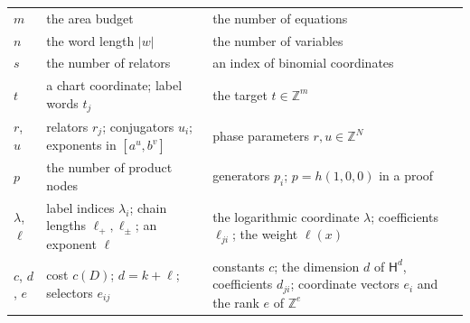 \documentclass[11pt,letterpaper]{article}
\theoremstyle{definition}
\theoremstyle{remark}
\newcommand{\Z}{\mathbb Z}
\newcommand{\HH}{\mathsf H}
\begin{document}
\begin{center}
\begin{longtable}{@{}p{}p{}p{}@{}}
$m$ & the area budget & the number of equations\\
$n$ & the word length $|w|$ & the number of variables\\
$s$ & the number of relators & an index of binomial coordinates\\
$t$ & a chart coordinate; label words $t_j$ & the target $t\in\Z^m$\\
$r$, $u$ & relators $r_j$; conjugators $u_i$; exponents in $[a^u,b^v]$ & phase parameters $r,u\in\Z^N$\\
$p$ & the number of product nodes & generators $p_i$; $p=h(1,0,0)$ in a proof\\
$\lambda$, $\ell$ & label indices $\lambda_i$; chain lengths $\ell_+,\ell_\pm$; an exponent $\ell$ & the logarithmic coordinate $\lambda$; coefficients $\ell_{ji}$; the weight $\ell(x)$\\
$c$, $d$, $e$ & cost $c(D)$; $d=k+\ell$; selectors $e_{ij}$ & constants $c$; the dimension $d$ of $\HH^d$, coefficients $d_{ji}$; coordinate vectors $e_i$ and the rank $e$ of $\Z^e$\\
\bottomrule
\end{longtable}
\end{center}
\end{document}
